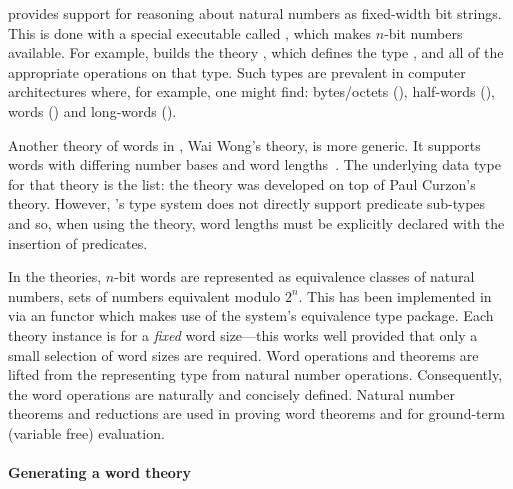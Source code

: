 {
\newcommand{\bitwise}{\ensuremath\mathtt{BITWISE}}
\newcommand{\slice}{\ensuremath\mathtt{SLICE}}
\newcommand{\bits}{\ensuremath\mathtt{BITS}}
\newcommand{\minn}{\ensuremath\mathtt{MIN}}
\newcommand{\bit}{\ensuremath\mathtt{BIT}}
\newcommand{\suc}{\ensuremath\mathtt{SUC}}
\newlength{\entrysize}
\newcommand{\cdotfill}{\hspace*{\fill}\ensuremath{\cdots}\hspace*{\fill}}

\HOL{} provides support for reasoning about natural numbers as
fixed-width bit strings.  This is done with a special executable
called , which makes $n$-bit numbers available.  For
example,  builds the theory ,
which defines the type , and all of the appropriate
operations on that type.  Such types are prevalent in computer
architectures where, for example, one might find: bytes/octets
(), half-words (), words () and
long-words ().

Another theory of words in \HOL{}, Wai Wong's  theory,
is more generic.  It supports words with differing number bases and
word lengths~\cite{wong}.  The underlying data type for that theory is
the list: the theory was developed on top of Paul Curzon's
 theory.  However, \HOL's type system does not directly
support predicate sub-types and so, when using the theory, word
lengths must be explicitly declared with the insertion of predicates.

In the  theories, $n$-bit words are
represented as equivalence classes of natural numbers, \ie{} sets of
numbers equivalent modulo $2^n$.  This has been implemented in \HOL{}
via an \ML{} functor which makes use of the system's equivalence type
package.  Each theory instance is for a \emph{fixed} word size---this
works well provided that only a small selection of word sizes are
required.  Word operations and theorems are lifted from the
representing type \ie{} from natural number operations.  Consequently,
the word operations are naturally and concisely defined.  Natural
number theorems and reductions are used in proving word theorems and
for ground-term (variable free) evaluation.

\paragraph{Generating a word theory}

}
